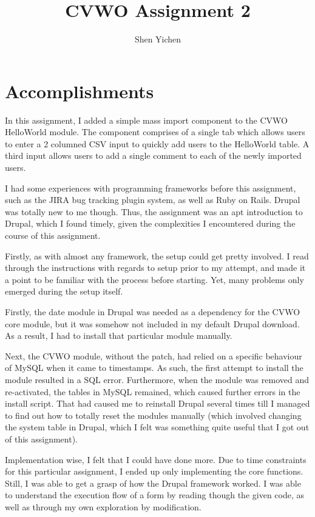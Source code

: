 \documentclass[12pt]{article}
\title{\textbf{\textsf{CVWO Assignment 2}}}
\date{}
\author{\textsf{Shen Yichen}}
\begin{document}
\maketitle

\section*{Accomplishments}

In this assignment, I added a simple mass import component to the CVWO HelloWorld module. The component comprises of a single tab which allows users to enter a 2 columned CSV input to quickly add users to the HelloWorld table. A third input allows users to add a single comment to each of the newly imported users.

I had some experiences with programming frameworks before this assignment, such as the JIRA bug tracking plugin system, as well as Ruby on Rails. Drupal was totally new to me though. Thus, the assignment was an apt introduction to Drupal, which I found timely, given the complexities I encountered during the course of this assignment.

Firstly, as with almost any framework, the setup could get pretty involved. I read through the instructions with regards to setup prior to my attempt, and made it a point to be familiar with the process before starting. Yet, many problems only emerged during the setup itself.

Firstly, the date module in Drupal was needed as a dependency for the CVWO core module, but it was somehow not included in my default Drupal download. As a result, I had to install that particular module manually.

Next, the CVWO module, without the patch, had relied on a specific behaviour of MySQL when it came to timestamps. As such, the first attempt to install the module resulted in a SQL error. Furthermore, when the module was removed and re-activated, the tables in MySQL remained, which caused further errors in the install script. That had caused me to reinstall Drupal several times till I managed to find out how to totally reset the modules manually (which involved changing the system
table in Drupal, which I felt was something quite useful that I got out of this assignment).

Implementation wise, I felt that I could have done more. Due to time constraints for this particular assignment, I ended up only implementing the core functions. Still, I was able to get a grasp of how the Drupal framework worked. I was able to understand the execution flow of a form by reading though the given code, as well as through my own exploration by modification.
\end{document}
